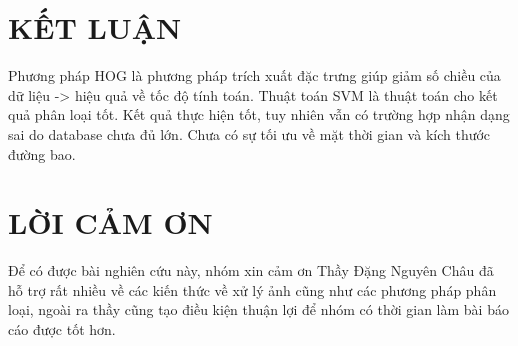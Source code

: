\documentclass[10pt,conference,a4paper]{IEEEtran}
\begin{document}
\section{KẾT LUẬN}
\label{Sec:KetLuan}
Phương pháp HOG là phương pháp trích xuất đặc trưng giúp giảm số chiều của dữ liệu -> hiệu quả về tốc độ tính toán.
Thuật toán SVM là thuật toán cho kết quả phân loại tốt.
Kết quả thực hiện tốt, tuy nhiên vẫn có trường hợp nhận dạng sai do database chưa đủ lớn.
Chưa có sự tối ưu về mặt thời gian và kích thước đường bao.






\section*{LỜI CẢM ƠN}
Để có được bài nghiên cứu này, nhóm xin cảm ơn Thầy Đặng Nguyên Châu đã hỗ trợ rất nhiều về các kiến thức về xử lý ảnh cũng như các phương pháp phân loại, ngoài ra thầy cũng tạo điều kiện thuận lợi để nhóm có thời gian làm bài báo cáo được tốt hơn.
{\Large 



}
\end{document}
